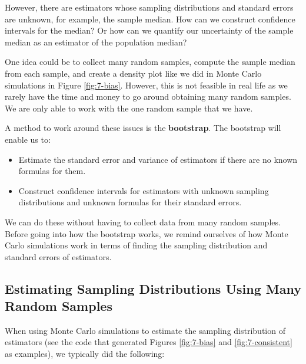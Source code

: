 \documentclass[
]{book}
\begin{document}
However, there are estimators whose sampling distributions and standard errors are unknown, for example, the sample median. How can we construct confidence intervals for the median? Or how can we quantify our uncertainty of the sample median as an estimator of the population median?

One idea could be to collect many random samples, compute the sample median from each sample, and create a density plot like we did in Monte Carlo simulations in Figure \ref{fig:7-bias}. However, this is not feasible in real life as we rarely have the time and money to go around obtaining many random samples. We are only able to work with the one random sample that we have.

A method to work around these issues is the \textbf{bootstrap}. The bootstrap will enable us to:

\begin{itemize}
\item
  Estimate the standard error and variance of estimators if there are no known formulas for them.
\item
  Construct confidence intervals for estimators with unknown sampling distributions and unknown formulas for their standard errors.
\end{itemize}

We can do these without having to collect data from many random samples. Before going into how the bootstrap works, we remind ourselves of how Monte Carlo simulations work in terms of finding the sampling distribution and standard errors of estimators.

\subsection{Estimating Sampling Distributions Using Many Random Samples}\label{estimating-sampling-distributions-using-many-random-samples}

When using Monte Carlo simulations to estimate the sampling distribution of estimators (see the code that generated Figures \ref{fig:7-bias} and \ref{fig:7-consistent} as examples), we typically did the following:
\end{document}
